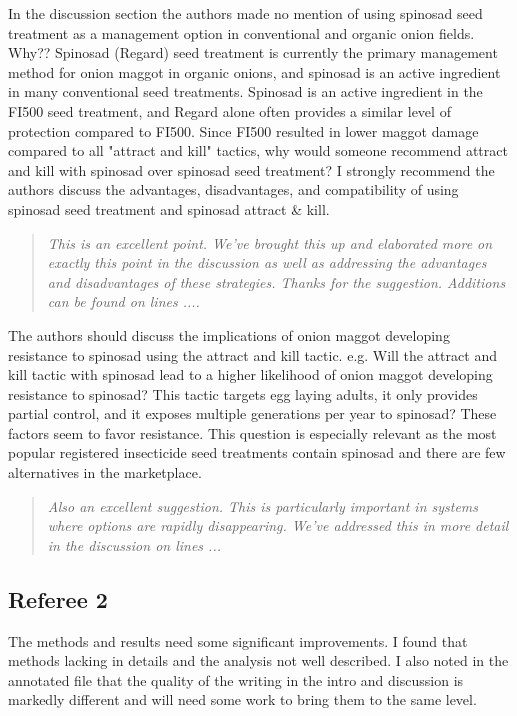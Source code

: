 \documentclass{article}
\begin{document}
In the discussion section the authors made no mention of using spinosad seed treatment as a management option in conventional and organic onion fields.  Why?? Spinosad (Regard) seed treatment is currently the primary management method for onion maggot in organic onions, and spinosad is an active ingredient in many conventional seed treatments.   Spinosad is an active ingredient in the FI500 seed treatment, and Regard alone often provides a similar level of protection compared to FI500.  Since FI500 resulted in lower maggot damage compared to all "attract and kill" tactics, why would someone recommend attract and kill with spinosad over spinosad seed treatment?   I strongly recommend the authors discuss the advantages, disadvantages, and compatibility of using spinosad seed treatment and spinosad attract & kill.    

\begin{quote}
    \textit{This is an excellent point.  We've brought this up and elaborated more on exactly this point in the discussion as well as addressing the advantages and disadvantages of these strategies.  Thanks for the suggestion.  Additions can be found on lines ....
    }
\end{quote}

The authors should discuss the implications of onion maggot developing resistance to spinosad using the attract and kill tactic.  e.g. Will the attract and kill tactic with spinosad lead to a higher likelihood of onion maggot developing resistance to spinosad?  This tactic targets egg laying adults, it only provides partial control, and it exposes multiple generations per year to spinosad?   These factors seem to favor resistance. This question is especially relevant as the most popular registered insecticide seed treatments contain spinosad and there are few alternatives in the marketplace.     

\begin{quote}
    \textit{Also an excellent suggestion.  This is particularly important in systems where options are rapidly disappearing.  We've addressed this in more detail in the discussion on lines ...
    }
\end{quote}

\subsection*{Referee 2}

The methods and results need some significant improvements. I found that methods lacking in details and the analysis not well described. I also noted in the annotated file that the quality of the writing in the intro and discussion is markedly different and will need some work to bring them to the same level.
\end{document}
